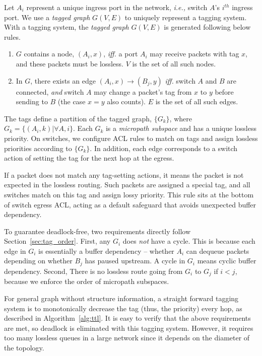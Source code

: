  Let $A_i$ represent a unique ingress port in the network, {\em i.e.,} switch $A$'s $i^{th}$ ingress port.
We use a {\em tagged graph} $G(V,E)$ to uniquely represent a tagging system.
With a tagging system, the {\em tagged graph} $G(V,E)$ is generated following below rules.

\begin{enumerate}
\item $G$ contains a node, $(A_i, x)$, {\em iff.} a port $A_i$ may receive packets with tag $x$, and these packets must 
be lossless. $V$ is the set of all such nodes.
\item In $G$, there exists an edge $(A_i, x)\rightarrow(B_j, y)$ {\em iff.} switch $A$ and $B$ are 
connected, {\em and} switch $A$ may change a packet's tag from $x$ to $y$ before sending to $B$ (the case $x=y$ also counts).
$E$ is the set of all such edges.
\end{enumerate}

The tags define a partition of the tagged graph, $\{G_k\}$, where $G_k = \{(A_i,
k) | \forall A, i\}$. Each $G_k$ is a {\em micropath subspace} and has a unique
lossless priority.  On switches, we configure ACL rules to match on tags and
assign lossless priorities according to $\{G_k\}$.  In addition, each edge corresponds 
to a switch action of setting the tag for the next hop at the egress.

If a packet does not match any
tag-setting actions, it means the packet is not expected in the lossless routing.
Such packets are assigned a special tag, and all switches match on this tag and 
assign lossy priority. This rule sits at the bottom of switch egress ACL, acting 
as a default safeguard that avoids unexpected buffer dependency.

To guarantee deadlock-free, two requirements directly follow Section~\ref{sec:tag_order}. 
First, any $G_i$ does {\em not} have a cycle. This is because each edge in $G_i$ is 
essentially a buffer dependency -- whether $A_i$ can dequeue packets depending on whether
$B_j$ has paused upstream. A cycle in $G_i$ means cyclic buffer dependency.
Second, There is no lossless route going from $G_i$ to $G_j$ if $i<j$, because
we enforce the order of micropath subspaces.


 For general graph without structure information, a straight forward tagging 
system is to monotonically decrease the tag (thus, the priority) every hop, as described in 
Algorithm~\ref{alg:ttl}. It is easy to verify that the above requirements are met, so deadlock is 
eliminated with this tagging system. However, it requires 
too many lossless queues in a large network since it depends on the diameter of the topology.


